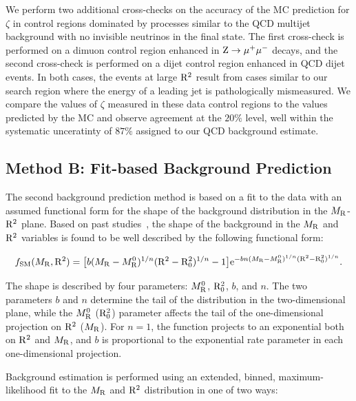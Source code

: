 We perform two additional cross-checks on the accuracy of the MC prediction for
$\zeta$ in control regions dominated by processes similar to the QCD multijet
background with no invisible neutrinos in the final state. The first 
cross-check is performed on a dimuon control region enhanced in $\mathrm{Z}\rightarrow{\mu}^+{\mu}^-$ decays, 
and the second cross-check is performed on a dijet control region enhanced in QCD dijet events. 
In both cases, the events at large $\mathrm{R}^2$ result from cases similar to our search region
where the energy of a leading jet is pathologically mismeasured. We compare the values of
$\zeta$ measured in these data control regions to the values predicted by the MC
and observe agreement at the $20\%$ level, well within the 
systematic unceratinty of $87\%$ assigned to our QCD background estimate. 


\subsection{Method B: Fit-based Background Prediction}
\label{sec:FitBkg}

The second background prediction method is based on a fit to the data with an 
assumed functional form for the shape of the background distribution in the $M_\mathrm{R}$-$\mathrm{R}^2$ plane. 
Based on past studies~\cite{razorPRD,razor8TeV}, the shape of the background in
the $M_\mathrm{R}$ and $\mathrm{R}^2$ variables is found to be well described by the following functional form:

\begin{equation}
 f_{\mathrm{SM}}(M_\mathrm{R},\mathrm{R}^2) =  \bigl[b(M_\mathrm{R}-{M_\mathrm{R}^0})^{1/n}(\mathrm{R}^2-{\mathrm{R}^2_0})
  ^{1/n}-1\bigr]\mathrm{e}^{-bn(M_\mathrm{R}-{M_\mathrm{R}^0})^{1/n}(\mathrm{R}^2-{\mathrm{R}^2_0})
    ^{1/n}} .
\label{eq:razFunction}
\end{equation}

The shape is described by four parameters: $M_\mathrm{R}^0$, $\mathrm{R}^2_0$, $b$, and $n$. 
The two parameters $b$ and $n$ determine the tail of the distribution in the 
two-dimensional plane, while the $M_\mathrm{R}^0$ ($\mathrm{R}^2_0$) parameter affects the tail of the 
one-dimensional projection on $\mathrm{R}^2$ ($M_\mathrm{R}$). For $n=1$, the function 
projects to an exponential both on $\mathrm{R}^2$ and $M_\mathrm{R}$, and $b$ is
proportional to the exponential rate parameter in each one-dimensional
projection. 

Background estimation is performed using an extended, binned, maximum-likelihood fit to the $M_\mathrm{R}$ and $\mathrm{R}^2$
distribution in one of two ways: 

